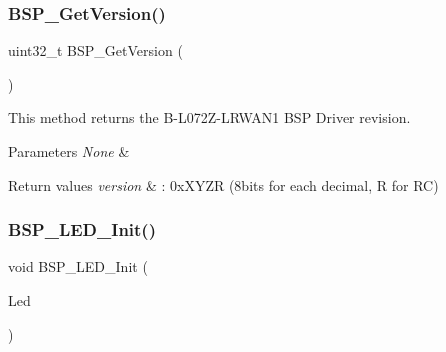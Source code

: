 \subsubsection{\texorpdfstring{B\+S\+P\+\_\+\+Get\+Version()}{BSP\_GetVersion()}}
{\footnotesize\ttfamily uint32\+\_\+t B\+S\+P\+\_\+\+Get\+Version (\begin{DoxyParamCaption}\item[{void}]{ }\end{DoxyParamCaption})}



This method returns the B-\/\+L072\+Z-\/\+L\+R\+W\+A\+N1 B\+SP Driver revision. 


\begin{DoxyParams}{Parameters}
{\em None} & \\
\hline
\end{DoxyParams}

\begin{DoxyRetVals}{Return values}
{\em version} & \+: 0x\+X\+Y\+ZR (8bits for each decimal, R for RC) \\
\hline
\end{DoxyRetVals}
\mbox{\label{group__B-L072Z-LRWAN1__LOW__LEVEL__Private__Defines_gab58a4f16a476a53653c5c400e3bed158}} 
\subsubsection{\texorpdfstring{B\+S\+P\+\_\+\+L\+E\+D\+\_\+\+Init()}{BSP\_LED\_Init()}}
{\footnotesize\ttfamily void B\+S\+P\+\_\+\+L\+E\+D\+\_\+\+Init (\begin{DoxyParamCaption}\item[{\hyperlink{group__B-L072Z-LRWAN1__LOW__LEVEL__Exported__Types_gaa059704b7ca945eb9c1e7f2c3d03fecd}{Led\+\_\+\+Type\+Def}}]{Led }\end{DoxyParamCaption})}




